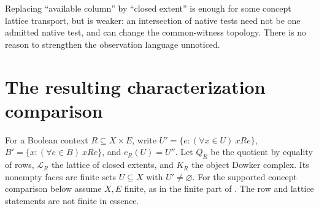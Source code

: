 \documentclass[11pt]{article}
\theoremstyle{definition}\newtheorem{definition}[theorem]{Definition}
\theoremstyle{remark}\newtheorem{remark}[theorem]{Remark}
\begin{document}
Replacing ``available column'' by ``closed extent'' is enough for some concept
lattice transport, but is weaker: an intersection of native tests need not be
one admitted native test, and can change the common-witness topology. There is
no reason to strengthen the observation language unnoticed.

\section{The resulting characterization comparison}
For a Boolean context $R\subseteq X\times E$, write
$U'=\{e:(\forall x\in U)\ xRe\}$, $B'=\{x:(\forall e\in B)\ xRe\}$,
and $c_R(U)=U''$. Let $Q_R$ be the quotient by equality of rows,
$\mathcal L_R$ the lattice of closed extents, and $K_R$ the object Dowker
complex. Its nonempty faces are finite sets $U\subseteq X$ with $U'\ne\varnothing$.
For the supported concept comparison below assume $X,E$ finite, as in the
finite part of \cite{Common}. The row and lattice statements are not finite
in essence.
\end{document}

